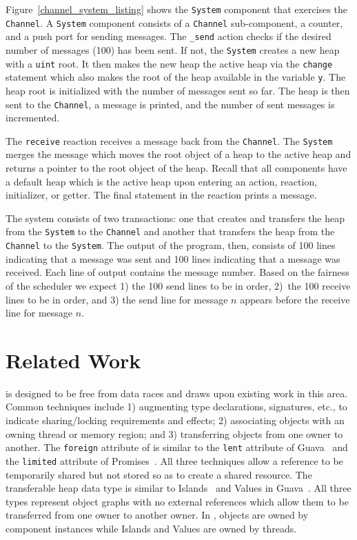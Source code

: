 Figure~\ref{channel_system_listing} shows the \verb+System+ component that exercises the \verb+Channel+.
A \verb+System+ component consists of a \verb+Channel+ sub-component, a counter, and a push port for sending messages.
The \verb+_send+ action checks if the desired number of messages (100) has been sent.
If not, the \verb+System+ creates a new heap with a \verb+uint+ root.
It then makes the new heap the active heap via the \verb+change+ statement which also makes the root of the heap available in the variable \verb+y+.
The heap root is initialized with the number of messages sent so far.
The heap is then sent to the \verb+Channel+, a message is printed, and the number of sent messages is incremented.

The \verb+receive+ reaction receives a message back from the \verb+Channel+.
The \verb+System+ merges the message which moves the root object of a heap to the active heap and returns a pointer to the root object of the heap.
Recall that all components have a default heap which is the active heap upon entering an action, reaction, initializer, or getter.
The final statement in the reaction prints a message.

The system consists of two transactions:  one that creates and transfers the heap from the \verb+System+ to the \verb+Channel+ and another that transfers the heap from the \verb+Channel+ to the \verb+System+.
The output of the program, then, consists of 100 lines indicating that a message was sent and 100 lines indicating that a message was received.
Each line of output contains the message number.
Based on the fairness of the scheduler we expect 1) the 100 send lines to be in order, 2)~the 100 receive lines to be in order, and 3) the send line for message $n$ appears before the receive line for message $n$.

\section{Related Work}

\rcgo{} is designed to be free from data races and draws upon existing work in this area.
Common techniques include 1) augmenting type declarations, signatures, etc., to indicate sharing/locking requirements and effects; 2) associating objects with an owning thread or memory region; and 3) transferring objects from one owner to another.
The \verb+foreign+ attribute of \rcgo{} is similar to the \verb+lent+ attribute of Guava~\cite{Bacon:2000:GDJ:353171.353197} and the \verb+limited+ attribute of Promises~\cite{Chan:1998:PLS:302163.302180}.
All three techniques allow a reference to be temporarily shared but not stored so as to create a shared resource.
The transferable heap data type is similar to Islands~\cite{Hogg:1991:IAP:117954.117975} and Values in Guava~\cite{Bacon:2000:GDJ:353171.353197}.
All three types represent object graphs with no external references which allow them to be transferred from one owner to another owner.
In \rcgo{}, objects are owned by component instances while Islands and Values are owned by threads.

